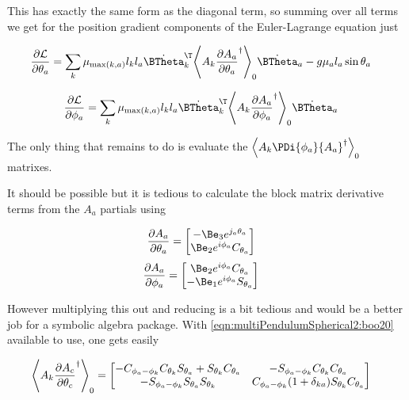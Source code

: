 This has exactly the same form as the diagonal term, so summing over all terms we get for the position gradient components of the Euler-Lagrange equation just

\begin{align}\label{eqn:multiPendulumSpherical2:boo41}
\PD{\theta_a}{\LL}
&=
\sum_{k}
\mu_{\max(k,a)} l_k l_a 
{\dot{\BTheta}_k}^\T
\gpgradezero{
A_k \PD{\theta_a}{A_a}^\dagger
} 
\dot{\BTheta}_a 
-g \mu_a l_a \sin\theta_a 
\end{align}

\begin{align}\label{eqn:multiPendulumSpherical2:boo40}
\PD{\phi_a}{\LL}
&=
\sum_{k}
\mu_{\max(k,a)} l_k l_a 
{\dot{\BTheta}_k}^\T
\gpgradezero{
A_k \PD{\phi_a}{A_a}^\dagger
} 
\dot{\BTheta}_a 
\end{align}

The only thing that remains to do is evaluate the $\gpgradezero{A_k \PDi{\phi_a}{A_a}^\dagger}$ matrixes.

It should be possible but it is tedious to calculate the block matrix derivative terms from the $A_a$ partials using

\begin{align}\label{eqn:multiPendulumSpherical2:boo10}
\PD{\theta_a}{A_a} &=
\begin{bmatrix}
-\Be_3 e^{j_a \theta_a} \\
\Be_2 e^{i \phi_a} C_{\theta_a}
\end{bmatrix}
\end{align}
\begin{align}\label{eqn:multiPendulumSpherical2:boo11}
\PD{\phi_a}{A_a}
&=
\begin{bmatrix}
\Be_2 e^{i \phi_a} C_{\theta_a} \\
-\Be_1 e^{i \phi_a} S_{\theta_a}
\end{bmatrix}
\end{align}

However multiplying this out and reducing is a bit tedious and would be a better job for a symbolic algebra package.  With \ref{eqn:multiPendulumSpherical2:boo20} available to use, one gets easily

\begin{align}\label{eqn:multiPendulumSpherical2:boo51}
\gpgradezero{ A_k \PD{\theta_c}{A_c}^\dagger }
&=
\begin{bmatrix}
-C_{\phi_a - \phi_k} C_{\theta_k} S_{\theta_a} + S_{\theta_k} C_{\theta_a} &
-S_{\phi_a - \phi_k} C_{\theta_k} C_{\theta_a} \\
-S_{\phi_a - \phi_k} S_{\theta_a} S_{\theta_k} &
C_{\phi_a - \phi_k} (1 + \delta_{k a}) S_{\theta_k} C_{\theta_a} 
\end{bmatrix}
\end{align}

